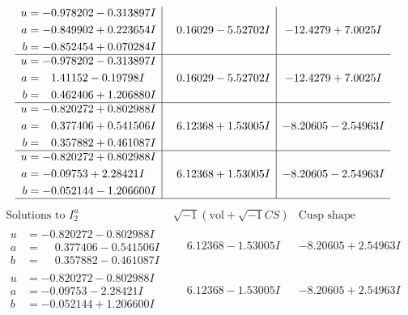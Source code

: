 \documentclass[1p]{elsarticle_modified}
\theoremstyle{definition}
\newcommand{\I}{\sqrt{-1}}
\begin{document}
$$\begin{array}{c|c|c}
\begin{aligned}
u &= -0.978202 - 0.313897 I \\
a &= -0.849902 + 0.223654 I \\
b &= -0.852454 + 0.070284 I\end{aligned}
 & \phantom{-}0.16029 - 5.52702 I & -12.4279 + 7.0025 I \\ \hline\begin{aligned}
u &= -0.978202 - 0.313897 I \\
a &= \phantom{-}1.41152 - 0.19798 I \\
b &= \phantom{-}0.462406 + 1.206880 I\end{aligned}
 & \phantom{-}0.16029 - 5.52702 I & -12.4279 + 7.0025 I \\ \hline\begin{aligned}
u &= -0.820272 + 0.802988 I \\
a &= \phantom{-}0.377406 + 0.541506 I \\
b &= \phantom{-}0.357882 + 0.461087 I\end{aligned}
 & \phantom{-}6.12368 + 1.53005 I & -8.20605 - 2.54963 I \\ \hline\begin{aligned}
u &= -0.820272 + 0.802988 I \\
a &= -0.09753 + 2.28421 I \\
b &= -0.052144 - 1.206600 I\end{aligned}
 & \phantom{-}6.12368 + 1.53005 I & -8.20605 - 2.54963 I\\
 \hline 
 \end{array}$$\newpage$$\begin{array}{c|c|c}  
\text{Solutions to }I^u_{2}& \I (\text{vol} + \sqrt{-1}CS) & \text{Cusp shape}\\
 \hline 
\begin{aligned}
u &= -0.820272 - 0.802988 I \\
a &= \phantom{-}0.377406 - 0.541506 I \\
b &= \phantom{-}0.357882 - 0.461087 I\end{aligned}
 & \phantom{-}6.12368 - 1.53005 I & -8.20605 + 2.54963 I \\ \hline\begin{aligned}
u &= -0.820272 - 0.802988 I \\
a &= -0.09753 - 2.28421 I \\
b &= -0.052144 + 1.206600 I\end{aligned}
 & \phantom{-}6.12368 - 1.53005 I & -8.20605 + 2.54963 I \\ \hline\begin{aligned}

\end{aligned}
\end{array}$$
\end{document}
